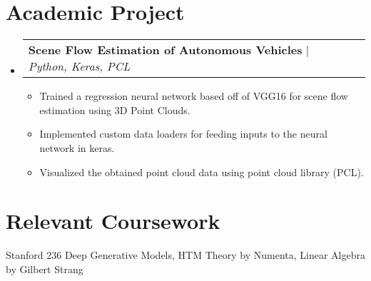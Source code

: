 \documentclass[letterpaper,10pt]{article}
\makeatletter
\newcommand{\resumeItem}[1]{
  \item\small{
    {#1 \vspace{-2pt}}
  }
}
\newcommand{\resumeProjectHeading}[2]{
    \item
    \begin{tabular*}{0.97\textwidth}{l@{\extracolsep{\fill}}r}
      \small#1 & #2 \\
    \end{tabular*}\vspace{-7pt}
}
\newcommand{\resumeSubHeadingListStart}{\begin{itemize}[leftmargin=0.15in, label={}]}
\newcommand{\resumeSubHeadingListEnd}{\end{itemize}}
\newcommand{\resumeItemListStart}{\begin{itemize}}
\newcommand{\resumeItemListEnd}{\end{itemize}\vspace{-5pt}}
\makeatother
\begin{document}
\section{Academic Project}
    \resumeSubHeadingListStart
      \resumeProjectHeading
          {\textbf{Scene Flow Estimation of Autonomous Vehicles} $|$ \emph{Python, Keras, PCL}}{}
          \resumeItemListStart
            \resumeItem{Trained a regression neural network based off of VGG16 for scene flow estimation using 3D Point Clouds.}
            \resumeItem{Implemented custom data loaders for feeding inputs to the neural network in keras.}
            \resumeItem{Visualized the obtained point cloud data using point cloud library (PCL).}
          \resumeItemListEnd
    \resumeSubHeadingListEnd

\section{Relevant Coursework}
\begin{itemize}[leftmargin=0.15in, label={}]
  \small{\item{
   Stanford 236 Deep Generative Models, HTM Theory by Numenta, Linear Algebra by Gilbert Strang
  }}
\end{itemize}
  

%
\end{document}
